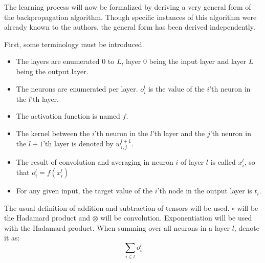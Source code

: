 \documentclass[12pt, titlepage]{article}
\begin{document}
		The learning process will now be formalized by deriving a very general form of the backpropagation algorithm. Though specific instances of this algorithm were already known to the authors, the general form has been derived independently.
		
		First, some terminology must be introduced.
		\begin{itemize}
			\item The layers are enumerated $0$ to $L$, layer $0$ being the input layer and layer $L$ being the output layer.
			\item The neurons are enumerated per layer. $o_i^l$ is the value of the $i$'th neuron in the $l$'th layer.
			\item The activation function is named $f$.
			\item The kernel between the $i$'th neuron in the $l$'th layer and the $j$'th neuron in the $l+1$'th layer is denoted by $w_{i,j}^{l+1}$.
			\item The result of convolution and averaging in neuron $i$ of layer $l$ is called $x_i^l$, so that $o_i^l=f(x_i^l)$
			\item For any given input, the target value of the $i$'th node in the output layer is $t_i$.
		\end{itemize} 
		The usual definition of addition and subtraction of tensors will be used. $\circ$ will be the Hadamard product and $\otimes$ will be convolution. Exponentiation will be used with the Hadamard product. When summing over all neurons in a layer $l$, denote it as:
		\begin{equation*}
		\sum_{i\in l}o^l_i
		\end{equation*}
		
\end{document}
